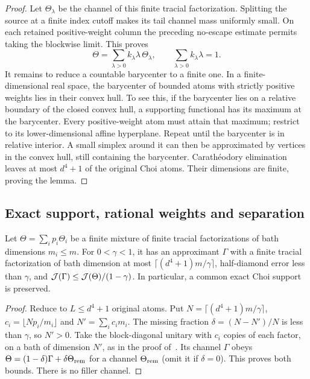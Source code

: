 \begin{proof}
Let $\Theta_\lambda$ be the channel of this finite tracial factorization. Splitting the source at a finite index cutoff makes its
tail channel mass uniformly small. On each retained positive-weight column the preceding no-escape estimate
permits taking the blockwise limit. This proves
\[
 \Theta=\sum_{\lambda>0}k_\lambda\lambda\,\Theta_\lambda,
 \qquad\sum_{\lambda>0}k_\lambda\lambda=1.
\]
It remains to reduce a countable barycenter to a finite one. In a finite-dimensional real space, the
barycenter of bounded atoms with strictly positive weights lies in their convex hull. To see this, if the
barycenter lies on a relative boundary of the closed convex hull, a supporting functional has its maximum
at the barycenter. Every positive-weight atom must attain that maximum; restrict to its lower-dimensional
affine hyperplane. Repeat until the barycenter is in relative interior. A small simplex around it can then
be approximated by vertices in the convex hull, still containing the barycenter. Carath\'eodory elimination
leaves at most $d^4+1$ of the original Choi atoms. Their dimensions are finite, proving the lemma.
\end{proof}

\subsection{Exact support, rational weights and separation}

\begin{lemma}\label{lem:support-copies}
Let $\Theta=\sum_ip_i\Theta_i$ be a finite mixture of finite tracial factorizations of bath dimensions $m_i\le m$.
For $0<\gamma<1$, it has an approximant $\Gamma$ with a finite tracial factorization of bath dimension at most
$\lceil(d^4+1)m/\gamma\rceil$, half-diamond error less than $\gamma$, and
$\mathcal J(\Gamma)\le\mathcal J(\Theta)/(1-\gamma)$.
In particular, a common exact Choi support is preserved.
\end{lemma}
\begin{proof}
Reduce to $L\le d^4+1$ original atoms. Put $N=\lceil(d^4+1)m/\gamma\rceil$,
$c_i=\lfloor Np_i/m_i\rfloor$ and $N'=\sum_ic_im_i$. The missing fraction
$\delta=(N-N')/N$ is less than $\gamma$, so $N'>0$.
Take the block-diagonal unitary with $c_i$ copies of each factor, on a bath of dimension $N'$, as in the proof
of~\cite[Theorem~3.6]{HaagerupMusat2015}.
Its channel $\Gamma$ obeys $\Theta=(1-\delta)\Gamma+\delta\Theta_{\rm rem}$ for a channel
$\Theta_{\rm rem}$ (omit it if $\delta=0$). This proves both bounds. There is no filler channel.
\end{proof}

